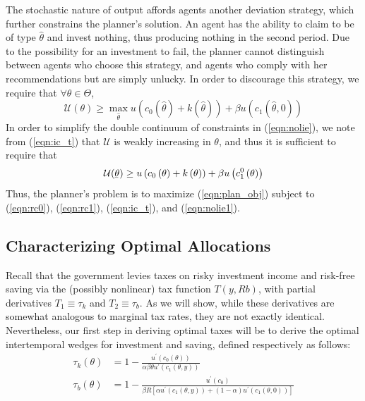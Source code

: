 \documentclass[11pt]{article}
\newcommand{\ubar}[1]{\underaccent{\bar}{#1}}
\newcommand{\U}{\mathcal{U}}
\begin{document}
The stochastic nature of output affords agents another deviation strategy, which further constrains the planner's solution. An agent has the ability to claim to be of type \( \hat{\theta} \) and invest nothing, thus producing nothing in the second period. Due to the possibility for an investment to fail, the planner cannot distinguish between agents who choose this strategy, and agents who comply with her recommendations but are simply unlucky. In order to discourage this strategy, we require that \( \forall\theta\in\Theta \),
\begin{equation}
    \U(\theta)\geq \max_{\hat{\theta}} u\left( c_0(\hat{\theta}) + k(\hat{\theta}) \right) + \beta u\left( c_1(\hat{\theta},0) \right) \label{eqn:nolie}
\end{equation}
In order to simplify the double continuum of constraints in (\ref{eqn:nolie}), we note from (\ref{eqn:ic_t}) that \( \mathcal{U} \) is weakly increasing in \( \theta \), and thus it is sufficient to require that
\begin{equation}
    \U(\ubar{\theta})\geq u\left(c_{0}\left(\theta\right)+k\left(\theta\right)\right)+\beta u\left(c_{1}^{0}\left(\theta\right)\right)\label{eqn:nolie1}
\end{equation}
Thus, the planner's problem is to maximize (\ref{eqn:plan_obj}) subject to (\ref{eqn:rc0}), (\ref{eqn:rc1}), (\ref{eqn:ic_t}), and (\ref{eqn:nolie1}).

\subsection{Characterizing Optimal Allocations}

Recall that the government levies taxes on risky investment income and risk-free saving via the (possibly nonlinear) tax function \( T(y,Rb) \), with partial derivatives \( T_1 \equiv \tau_k \) and \( T_2\equiv\tau_b \). As we will show, while these derivatives are somewhat analogous to marginal tax rates, they are not exactly identical. Nevertheless, our first step in deriving optimal taxes will be to derive the optimal intertemporal wedges for investment and saving, defined respectively as follows:
\begin{align}
    \tau_{k}\left(\theta\right) &= 1-\frac{u^{\prime}\left(c_{0}\left(\theta\right)\right)}{\alpha\beta\theta u^{\prime}\left(c_{1}\left(\theta,y\right)\right)} \\
    \tau_{b}\left(\theta\right) &= 1-\frac{u^{\prime}\left(c_{0}\right)}{\beta R\left[\alpha u^{\prime}\left(c_{1}\left(\theta,y\right)\right)+\left(1-\alpha\right)u^{\prime}\left(c_{1}\left(\theta,0\right)\right)\right]}
\end{align}
\end{document}
